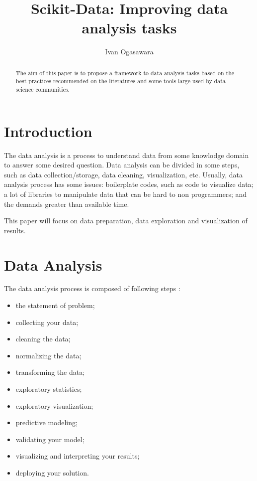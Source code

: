 \documentclass[12pt,a4paper]{amsart}
\numberwithin{equation}{section}
\theoremstyle{plain}
\theoremstyle{definition}
\begin{document}
\title{Scikit-Data: Improving data analysis tasks}


\author[I. Ogasawara]{Ivan Ogasawara}





\begin{abstract} The aim of this paper is to propose a framework to data analysis tasks based on the best practices recommended on the literatures and some tools large used by data science communities.
\end{abstract}

\maketitle

\section{Introduction}\label{introduction} The data analysis is a process to understand data from some knowlodge domain to answer some desired question. Data analysis can be divided in some steps, such as data collection/storage, data cleaning, visualization, etc. Usually, data analysis process has some issues: boilerplate codes, such as code to visualize data; a lot of libraries to manipulate data that can be hard to non programmers; and the demands greater than available time.

This paper will focus on data preparation, data exploration and visualization of results.

\section{Data Analysis}\label{data-analysis}

The data analysis process is composed of following steps \cite{cuesta2016practical}:

\begin{itemize}

\item the statement of problem;
\item collecting your data;
\item cleaning the data;
\item normalizing the data;
\item transforming the data;
\item exploratory statistics;
\item exploratory visualization;
\item predictive modeling;
\item validating your model;
\item visualizing and interpreting your results;
\item deploying your solution.

\end{itemize}
\end{document}
